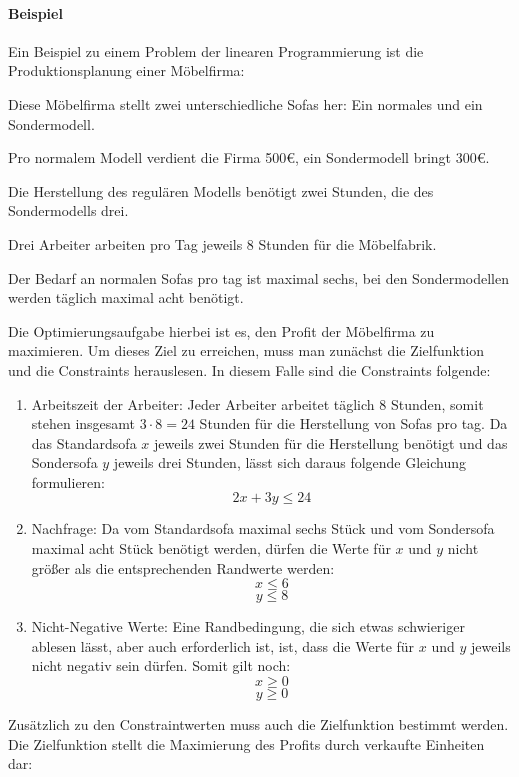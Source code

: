 \documentclass[a4paper, 11pt]{article}
\begin{document}
\paragraph{Beispiel}
Ein Beispiel zu einem Problem der linearen Programmierung ist die Produktionsplanung
einer Möbelfirma:

Diese Möbelfirma stellt zwei unterschiedliche Sofas her: Ein normales und ein
Sondermodell.

Pro normalem Modell verdient die Firma 500\euro, ein Sondermodell bringt 300\euro.

Die Herstellung des regulären Modells benötigt zwei Stunden, die des Sondermodells
drei.

Drei Arbeiter arbeiten pro Tag jeweils 8 Stunden für die Möbelfabrik.

Der Bedarf an normalen Sofas pro tag ist maximal sechs, bei den Sondermodellen werden
täglich maximal acht benötigt.

Die Optimierungsaufgabe hierbei ist es, den Profit der Möbelfirma zu maximieren.
Um dieses Ziel zu erreichen, muss man zunächst die Zielfunktion und die Constraints
herauslesen. In diesem Falle sind die Constraints folgende:

\begin{enumerate}
  \item Arbeitszeit der Arbeiter: Jeder Arbeiter arbeitet täglich 8 Stunden,
  somit stehen insgesamt $3 \cdot 8 = 24$ Stunden für die Herstellung von
  Sofas pro tag. Da das Standardsofa $x$ jeweils zwei Stunden für die Herstellung
  benötigt und das Sondersofa $y$ jeweils drei Stunden, lässt sich daraus folgende
  Gleichung formulieren:
  $$2x + 3y \leq 24$$

  \item Nachfrage: Da vom Standardsofa maximal sechs Stück und vom Sondersofa
  maximal acht Stück benötigt werden, dürfen die Werte für $x$ und $y$ nicht
  größer als die entsprechenden Randwerte werden:
  $$x \leq 6$$
  $$y \leq 8$$

  \item Nicht-Negative Werte: Eine Randbedingung, die sich etwas schwieriger
  ablesen lässt, aber auch erforderlich ist, ist, dass die Werte für $x$ und $y$
  jeweils nicht negativ sein dürfen. Somit gilt noch:
  $$x \geq 0$$
  $$y \geq 0$$
\end{enumerate}

Zusätzlich zu den Constraintwerten muss auch die Zielfunktion bestimmt werden.
Die Zielfunktion stellt die Maximierung des Profits durch verkaufte Einheiten dar:
\end{document}

